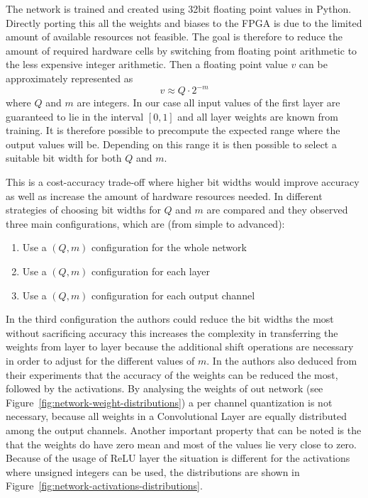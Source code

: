 The network is trained and created using 32bit floating point values in Python. Directly porting this all the weights and biases to the FPGA is due to the limited amount of available resources not feasible. The goal is therefore to reduce the amount of required hardware cells by switching from floating point arithmetic to the less expensive integer arithmetic. Then a floating point value $v$ can be approximately represented as 
\begin{equation}
	v \approx Q \cdot 2 ^{-m}
\end{equation}
where $Q$ and $m$ are integers. In our case all input values of the first layer are guaranteed to lie in the interval $[0,1]$ and all layer weights are known from training. It is therefore possible to precompute the expected range where the output values will be. Depending on this range it is then possible to select a suitable bit width for both $Q$ and $m$.

This is a cost-accuracy trade-off where higher bit widths would improve accuracy as well as increase the amount of hardware resources needed.
In \cite{Wu:2018aa} different strategies of choosing bit widths for $Q$ and $m$ are compared and they observed three main configurations, which are (from simple to advanced):
\begin{enumerate}
	\item Use a $(Q,m)$ configuration for the whole network
	\item Use a $(Q,m)$ configuration for each layer
	\item Use a $(Q,m)$ configuration for each output channel 
\end{enumerate}
In the third configuration the authors could reduce the bit widths the most without sacrificing accuracy this increases the complexity in transferring the weights from layer to layer because the additional shift operations are necessary in order to adjust for the different values of $m$.
In \cite{Wu:2018aa} the authors also deduced from their experiments that the accuracy of the weights can be reduced the most, followed by the activations. By analysing the weights of out network (see Figure~\ref{fig:network-weight-distributions}) a per channel quantization is not necessary, because all weights in a Convolutional Layer are equally distributed among the output channels. Another important property that can be noted is the that the weights do have zero mean and most of the values lie very close to zero. Because of the usage of ReLU layer the situation is different for the activations where unsigned integers can be used, the distributions are shown in Figure~\ref{fig:network-activations-distributions}.

